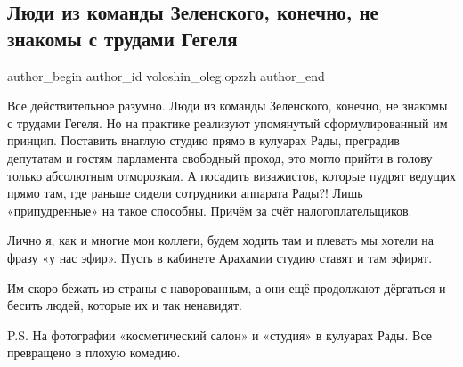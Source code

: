  
 
 
 
 
 
\subsection{Люди из команды Зеленского, конечно, не знакомы с трудами Гегеля}
\label{sec:16_12_2021.fb.voloshin_oleg.opzzh.1.zelja_gegel}
 
\ifcmt
 author_begin
   author_id voloshin_oleg.opzzh
 author_end
\fi

Все действительное разумно. Люди из команды Зеленского, конечно, не знакомы с
трудами Гегеля. Но на практике реализуют упомянутый сформулированный им
принцип. Поставить внаглую студию прямо в кулуарах Рады, преградив депутатам и
гостям парламента свободный проход, это могло прийти в голову только абсолютным
отморозкам. А посадить визажистов, которые пудрят ведущих прямо там, где раньше
сидели сотрудники аппарата Рады?! Лишь «припудренные» на такое способны. Причём
за счёт налогоплательщиков.


Лично я, как и многие мои коллеги, будем ходить там и плевать мы хотели на
фразу «у нас эфир». Пусть в кабинете Арахамии студию ставят и там эфирят. 

Им скоро бежать из страны с наворованным, а они ещё продолжают дёргаться и
бесить людей, которые их и так ненавидят.

P.S. На фотографии «косметический салон» и «студия» в кулуарах Рады. Все
превращено в плохую комедию.

